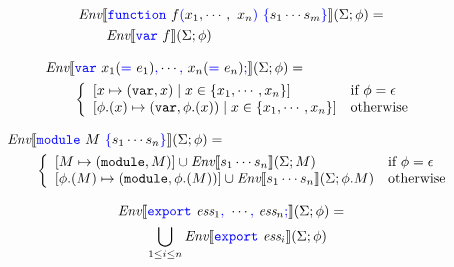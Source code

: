 \documentclass[a4paper]{article}
\newcommand{\code}[1]{\textcolor{blue}{\tt #1}}
\newcommand{\var}{{\tt{var}}}
\newcommand{\module}{{\tt{module}}}
\newcommand{\Env}{\emph{Env}}
\newcommand{\If}{\mbox{if}}
\newcommand{\Otherwise}{\mbox{otherwise}}
\begin{document}
\begin{equation*}
\begin{split}
&\Env \llbracket \code{function}\ f\code{(}x_1, \cdots,\ x_n\code{)}\ \code{\{} s_1 \cdots s_m \code{\}} \rrbracket (\Sigma; \phi) = \\
&\qquad \Env \llbracket \code{var}\ f \rrbracket (\Sigma; \phi)
\end{split}
\end{equation*}

\begin{equation*}
\begin{split}
&\Env \llbracket \code{var}\ x_1 (\code{=}\ e_1) \code{,} \cdots \code{,}\ x_n (\code{=}\ e_n) \code{;} \rrbracket (\Sigma; \phi) = \\
&\qquad \left\{\begin{array}{ll}
[x \mapsto (\var, x) \mid x \in \{x_1, \cdots, x_n\}] & \If\ \phi = \epsilon \\ {}
[\phi.(x) \mapsto (\var, \phi.(x)) \mid x \in \{x_1, \cdots, x_n\}] & \Otherwise
\end{array}\right.
\end{split}
\end{equation*}

\begin{equation*}
\begin{split}
&\Env \llbracket \code{module}\ M\ \code{\{} s_1 \cdots s_n \code{\}} \rrbracket (\Sigma; \phi) = \\
&\qquad \left\{\begin{array}{ll}
[M \mapsto (\module, M)] \cup \Env \llbracket s_1 \cdots s_n \rrbracket (\Sigma; M) & \If\ \phi = \epsilon \\ {}
[\phi.(M) \mapsto (\module, \phi.(M))] \cup \Env \llbracket s_1 \cdots s_n \rrbracket (\Sigma; \phi.M) & \Otherwise
\end{array}\right.
\end{split}
\end{equation*}

\begin{equation*}
\begin{split}
&\Env \llbracket \code{export}\ \emph{ess}_1\code{,}\ \cdots\code{,}\ \emph{ess}_n \code{;} \rrbracket (\Sigma; \phi) = \\
&\qquad\bigcup_{1 \le i \le n} \Env \llbracket \code{export}\ \emph{ess}_i \rrbracket (\Sigma; \phi)
\end{split}
\end{equation*}
\end{document}
